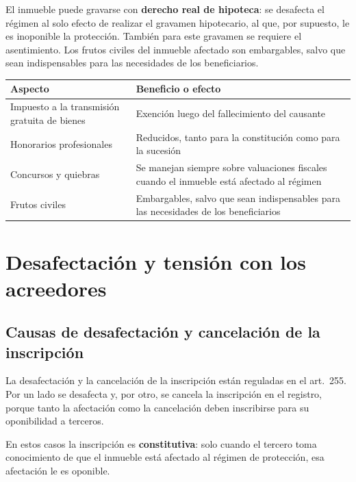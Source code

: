 \documentclass[12pt,oneside]{book}
\begin{document}
El inmueble puede gravarse con \textbf{derecho real de hipoteca}: se desafecta el régimen al solo efecto de realizar el gravamen hipotecario, al que, por supuesto, le es inoponible la protección. También para este gravamen se requiere el asentimiento. Los frutos civiles del inmueble afectado son embargables, salvo que sean indispensables para las necesidades de los beneficiarios.

\begin{table}[H]
\centering
\begin{tabularx}{\textwidth}{@{}>{\raggedright\arraybackslash}p{}>{\raggedright\arraybackslash}X@{}}
\toprule
\textbf{Aspecto} & \textbf{Beneficio o efecto} \\
\midrule
Impuesto a la transmisión gratuita de bienes & Exención luego del fallecimiento del causante \\
Honorarios profesionales & Reducidos, tanto para la constitución como para la sucesión \\
Concursos y quiebras & Se manejan siempre sobre valuaciones fiscales cuando el inmueble está afectado al régimen \\
Frutos civiles & Embargables, salvo que sean indispensables para las necesidades de los beneficiarios \\
\bottomrule
\end{tabularx}
\end{table}

\section{Desafectación y tensión con los acreedores}

\subsection{Causas de desafectación y cancelación de la inscripción}

La desafectación y la cancelación de la inscripción están reguladas en el art.~255. Por un lado se desafecta y, por otro, se cancela la inscripción en el registro, porque tanto la afectación como la cancelación deben inscribirse para su oponibilidad a terceros.

\begin{important}
En estos casos la inscripción es \textbf{constitutiva}: solo cuando el tercero toma conocimiento de que el inmueble está afectado al régimen de protección, esa afectación le es oponible.
\end{important}
\end{document}
